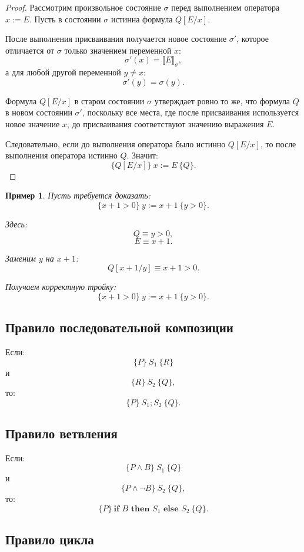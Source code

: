 \documentclass[12pt,a4paper]{article}
\newtheorem{example}{Пример}
\begin{document}
\begin{proof}
Рассмотрим произвольное состояние $\sigma$ перед выполнением оператора $x := E$.
Пусть в состоянии $\sigma$ истинна формула $Q[E/x]$.

После выполнения присваивания получается новое состояние $\sigma'$, которое отличается от $\sigma$ только значением переменной $x$:
\[
    \sigma'(x) = \llbracket E \rrbracket_\sigma,
\]
а для любой другой переменной $y \neq x$:
\[
    \sigma'(y) = \sigma(y).
\]

Формула $Q[E/x]$ в старом состоянии $\sigma$ утверждает ровно то же, что формула $Q$ в новом состоянии $\sigma'$, поскольку все места, где после присваивания используется новое значение $x$, до присваивания соответствуют значению выражения $E$.

Следовательно, если до выполнения оператора было истинно $Q[E/x]$, то после выполнения оператора истинно $Q$.
Значит:
\[
    \{Q[E/x]\}\ x := E\ \{Q\}.
\]
\end{proof}

\begin{example}
Пусть требуется доказать:
\[
    \{x + 1 > 0\}\ y := x + 1\ \{y > 0\}.
\]

Здесь:
\[
    Q \equiv y > 0,
\]
\[
    E \equiv x + 1.
\]

Заменим $y$ на $x+1$:
\[
    Q[x+1/y] \equiv x + 1 > 0.
\]

Получаем корректную тройку:
\[
    \{x + 1 > 0\}\ y := x + 1\ \{y > 0\}.
\]
\end{example}

\subsection{Правило последовательной композиции}

Если:
\[
    \{P\}\ S_1\ \{R\}
\]
и
\[
    \{R\}\ S_2\ \{Q\},
\]
то:
\[
    \{P\}\ S_1;S_2\ \{Q\}.
\]

\subsection{Правило ветвления}

Если:
\[
    \{P \land B\}\ S_1\ \{Q\}
\]
и
\[
    \{P \land \neg B\}\ S_2\ \{Q\},
\]
то:
\[
    \{P\}\ \textbf{if } B \textbf{ then } S_1 \textbf{ else } S_2\ \{Q\}.
\]

\subsection{Правило цикла}
\end{document}
